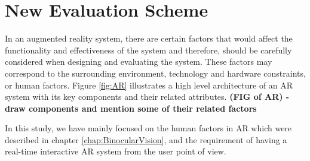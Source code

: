 
\section{New Evaluation Scheme}

In an augmented reality system, there are certain factors that would affect the functionality and effectiveness of the system \cite{liv05,kru10} and therefore, 
should be carefully considered when designing and evaluating the system. 
These factors may correspond to the surrounding 
environment, technology and hardware constraints, or human factors. 
Figure \ref{fig:AR} illustrates a high level architecture of an AR system with its key components and their related attributes.
\textbf{(FIG of AR) - draw components and mention some of their related factors}

In this study, we have mainly focused on the human factors in AR which were described in chapter \ref{chap:BinocularVision},
and the requirement of having a real-time interactive AR system from the user point of view.


